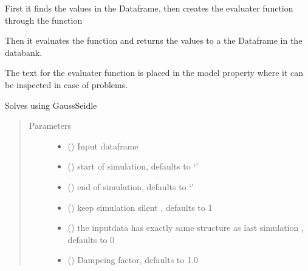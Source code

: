 \documentclass[letterpaper,10pt,english]{sphinxmanual}
\begin{document}
\begin{fulllineitems}
\begin{fulllineitems}
\sphinxAtStartPar
First it finds the values in the Dataframe, then creates the evaluater function through the  function

\sphinxAtStartPar
Then it evaluates the function and returns the values to a the Dataframe in the databank.

\sphinxAtStartPar
The text for the evaluater function is placed in the model property 
where it can be inspected
in case of problems.

\sphinxAtStartPar
Solves using Gauss\sphinxhyphen{}Seidle
\begin{quote}\begin{description}
\item[{Parameters}] \leavevmode\begin{itemize}
\item {} 
\sphinxAtStartPar
{} () \textendash{} Input dataframe

\item {} 
\sphinxAtStartPar
{} () \textendash{} start of simulation, defaults to ‘’

\item {} 
\sphinxAtStartPar
{} () \textendash{} end of simulation, defaults to ‘’

\item {} 
\sphinxAtStartPar
{} (\sphinxstyleliteralemphasis{\sphinxupquote{, }}) \textendash{} keep simulation silent , defaults to 1

\item {} 
\sphinxAtStartPar
{} (\sphinxstyleliteralemphasis{\sphinxupquote{, }}) \textendash{} the inputdata has exactly same structure as last simulation , defaults to 0

\item {} 
\sphinxAtStartPar
{} (\sphinxstyleliteralemphasis{\sphinxupquote{, }}) \textendash{} Dampeing factor, defaults to 1.0


\end{itemize}
\end{description}
\end{quote}
\end{fulllineitems}
\end{fulllineitems}
\end{document}
